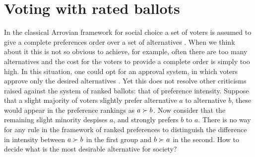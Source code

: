 



\section{Voting with rated ballots}
\label{sec:judgmentballots}

In the classical Arrovian framework for social choice a set of voters is assumed to give a complete preferences order over a set of alternatives \citep{Arrow1950}.
When we think about it this is not so obvious to achieve, for example, often there are too many alternatives and the cost for the voters to provide a complete order is simply too high.
In this situation, one could opt for an approval system, in which voters approve only the desired alternatives \citep{Brams2007}. Yet this does not resolve other criticisms raised against the system of ranked ballots: that of preference intensity. 
Suppose that a slight majority of voters slightly prefer alternative $a$ to alternative $b$, these would appear in the preference rankings as $a \succ b$. Now consider that the remaining slight minority despises $a$, and strongly prefers $b$ to $a$. There is no way for any rule in the framework of ranked preferences to distinguish the difference in intensity between $a \succ b$ in the first group and $b \succ a$ in the second. How to decide what is the most desirable alternative for society?

